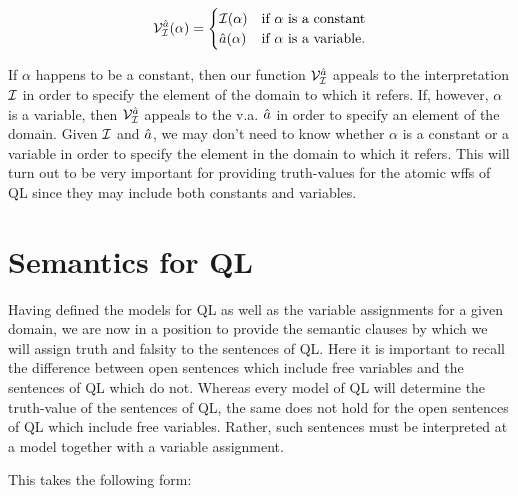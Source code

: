 \begin{align*}
  \mathcal{V}_{\mathcal{I}}^{\hat{a}}{(\alpha)}=
    \begin{cases}
      \mathcal{I}(\alpha) & \text{if } \alpha \text{ is a constant} \\
      \hat{a}(\alpha) & \text{if } \alpha \text{ is a variable.}
    \end{cases}
\end{align*}

If $\alpha$ happens to be a constant, then our function $\mathcal{V}_{\mathcal{I}}^{\hat{a}}{}$ appeals to the interpretation $\mathcal{I}$ in order to specify the element of the domain to which it refers. 
If, however, $\alpha$ is a variable, then $\mathcal{V}_{\mathcal{I}}^{\hat{a}}{}$ appeals to the v.a. $\hat{a}$ in order to specify an element of the domain.
Given $\mathcal{I}$ and $\hat{a}$, we may don't need to know whether $\alpha$ is a constant or a variable in order to specify the element in the domain to which it refers.
This will turn out to be very important for providing truth-values for the atomic wffs of QL since they may include both constants and variables.





\section{Semantics for QL}

Having defined the models for QL as well as the variable assignments for a given domain, we are now in a position to provide the semantic clauses by which we will assign truth and falsity to the sentences of QL.
Here it is important to recall the difference between open sentences which include free variables and the sentences of QL which do not.
Whereas every model of QL will determine the truth-value of the sentences of QL, the same does not hold for the open sentences of QL which include free variables.
Rather, such sentences must be interpreted at a model together with a variable assignment.


This takes the following form:

